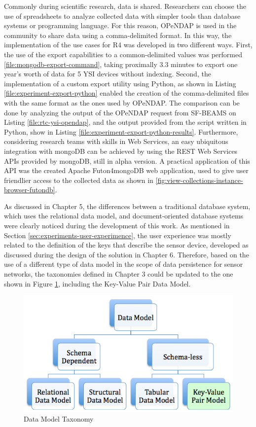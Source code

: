 Commonly during scientific research, data is shared. Researchers can choose
the use of spreadsheets to analyze collected data with simpler tools than
database systems or programming language. For this reason, OPeNDAP is used in
the community to share data using a comma-delimited format. In this way, the
implementation of the use cases for R4 was developed in two different ways.
First, the use of the export capabilities to a common-delimited values was
performed \ref{file:mongodb-export-command}, taking proximally 3.3 minutes to
export one year's worth of data for 5 YSI devices without indexing. Second, the
implementation of a custom export utility using Python, as shown in Listing
\ref{file:experiment-export-python} enabled the creation of the comma-delimited
files with the same format as the ones used by OPeNDAP. The comparison can be
done by analyzing the output of the OPeNDAP request from SF-BEAMS on Listing
\ref{file:rtc-ysi-opendap}, and the output provided from the script written in
Python, show in Listing \ref{file:experiment-export-python-results}.
Furthermore, considering research teams with skills in Web Services, an easy
ubiquitous integration with mongoDB can be achieved by using the REST Web
Services APIs provided by mongoDB, still in alpha version. A practical application of
this API was the created Apache Futon4mongoDB web application, used to give
user friendlier access to the collected data as shown in 
\ref{fig:view-collections-instance-browser-futondb}. 
 
As discussed in Chapter 5, the differences between a traditional database
system, which uses the relational data model, and document-oriented database
systems were clearly noticed during the development of this work. As mentioned
in Section \ref{sec:experiments-user-experimence}, the user experience was
mostly related to the definition of the keys that describe the sensor device,
developed as discussed during the design of the solution in Chapter 6. 
Therefore, based on the use of a different type of data model in the scope of
data persistence for sensor networks, the taxonomies defined in Chapter 3
could be updated to the one shown in Figure
\ref{fig:taxonomy-data-model-modified}, including the Key-Value Pair Data
Model.

\begin{figure}[!h]
  \centering
  \includegraphics[scale=0.5]{../diagrams/taxonomy-data-model-modified}
  \caption{Data Model Taxonomy}
  \label{fig:taxonomy-data-model-modified}
\end{figure}

